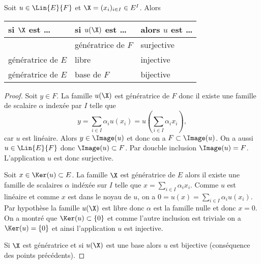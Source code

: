 \begin{prop}\label{prop:propdeduitesu}
  Soit $u \in \Lin{E}{F}$ et $\X=(x_i)_{i \in I} \in E^I$. Alors
  \begin{center}
    \begin{tabular}{|l|l|l|}\hline
      si $\X$ est \ldots & si $u(\X)$ est \ldots & alors $u$ est \ldots \\\hline
      & génératrice de $F$ & surjective \\
      génératrice de $E$ & libre & injective \\
      génératrice de $E$ & base de $F$ & bijective \\ \hline
    \end{tabular}
  \end{center}

\end{prop}
\begin{proof}
  Soit $y \in F$. La famille $u(\X)$ est génératrice de $F$ donc il existe une famille de scalaire $\alpha$ indexée par $I$ telle que
  \begin{equation}
    y = \sum_{i \in I} \alpha_i u(x_i)=u \left( \sum_{i \in I} \alpha_i x_i \right),
  \end{equation}
  car $u$ est linéaire. Alors $y \in \Image(u)$ et donc on a $F \subset \Image(u)$. On a aussi $u \in \Lin{E}{F}$ donc $\Image(u) \subset F$. Par doucble inclusion $\Image(u)=F$. L'application $u$ est donc surjective.

  Soit $x \in \Ker(u) \subset E$. La famille $\X$ est génératrice de $E$ alors il existe une famille de scalaires $\alpha$ indéxée sur $I$ telle que $x = \sum_{i \in I} \alpha_i x_i$. Comme $u$ est linéaire et comme $x$ est dans le noyau de $u$, on a $0=u(x) = \sum_{i \in I} \alpha_i u(x_i)$. Par hypothèse la famille $u(\X)$ est libre donc $\alpha$ est la famille nulle et donc $x=0$. On a montré que $\Ker(u) \subset \{0\}$ et comme l'autre inclusion est triviale on a $\Ker(u)=\{0\}$ et ainsi l'application $u$ est injective.

  Si $\X$ est génératrice et si $u(\X)$ est une base alors $u$ est bijective (conséquence des points précédents).
\end{proof}

